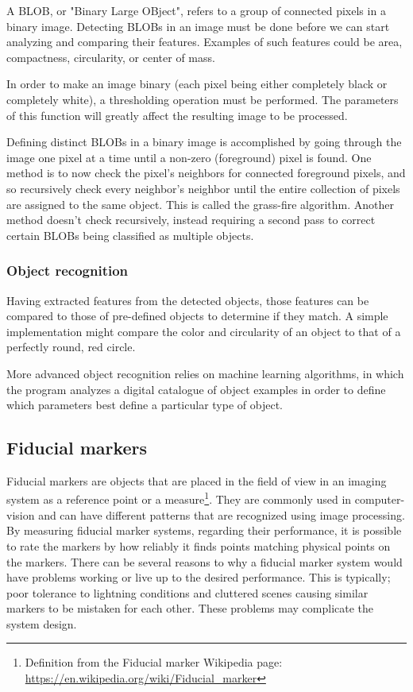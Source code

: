 			A BLOB, or "Binary Large OBject", refers to a group of connected pixels in a binary image. Detecting BLOBs in an image must be done before we can start analyzing and comparing their features. Examples of such features could be area, compactness, circularity, or center of mass.
			
			In order to make an image binary (each pixel being either completely black or completely white), a thresholding operation must be performed. The parameters of this function will greatly affect the resulting image to be processed. 
			
			Defining distinct BLOBs in a binary image is accomplished by going through the image one pixel at a time until a non-zero (foreground) pixel is found. One method is to now check the pixel's neighbors for connected foreground pixels, and so recursively check every neighbor's neighbor until the entire collection of pixels are assigned to the same object. This is called the grass-fire algorithm. Another method doesn't check recursively, instead requiring a second pass to correct certain BLOBs being classified as multiple objects.
			
			\subsubsection{Object recognition}
				Having extracted features from the detected objects, those features can be compared to those of pre-defined objects to determine if they match. A simple implementation might compare the color and circularity of an object to that of a perfectly round, red circle. 
				
				More advanced object recognition relies on machine learning algorithms, in which the program analyzes a digital catalogue of object examples in order to define which parameters best define a particular type of object.
			
			
			\subsection{Fiducial markers}\label{sec:fiducialMarkers}
			Fiducial markers are objects that are placed in the field of view in an imaging system as a reference point or a measure\footnote{Definition from the Fiducial marker Wikipedia page: \url{https://en.wikipedia.org/wiki/Fiducial_marker}}. They are commonly used in computer-vision and can have different patterns that are recognized using image processing. By measuring fiducial marker systems, regarding their performance, it is possible to rate the markers by how reliably it finds points matching physical points on the markers. There can be several reasons to why a fiducial marker system would have problems working or live up to the desired performance. This is typically; poor tolerance to lightning conditions and cluttered scenes causing similar markers to be mistaken for each other\cite{fiducialMarkers}. These problems may complicate the system design.\\
			
